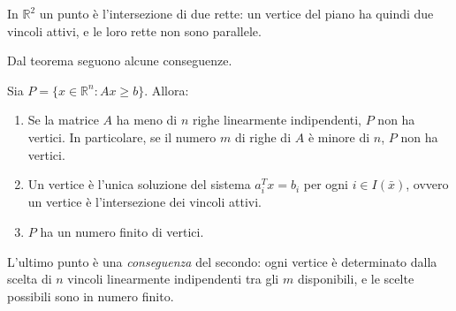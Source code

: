 \begin{osservazione}
In $\mathbb{R}^2$ un punto è l'intersezione di due rette: un vertice del piano ha quindi due vincoli attivi, e le loro rette non sono parallele.
\end{osservazione}

Dal teorema seguono alcune conseguenze.

\begin{corollario}\label{cor:vertici}
Sia $P = \{x \in \mathbb{R}^n : A x \ge b\}$. Allora:
\begin{enumerate}
    \item Se la matrice $A$ ha meno di $n$ righe linearmente indipendenti, $P$ non ha vertici. In particolare, se il numero $m$ di righe di $A$ è minore di $n$, $P$ non ha vertici.
    \item Un vertice è l'unica soluzione del sistema $a_i^T x = b_i$ per ogni $i \in I(\bar{x})$, ovvero un vertice è l'intersezione dei vincoli attivi.
    \item $P$ ha un numero finito di vertici.
\end{enumerate}
\end{corollario}

L'ultimo punto è una \emph{conseguenza} del secondo: ogni vertice è determinato dalla scelta di $n$ vincoli linearmente indipendenti tra gli $m$ disponibili, e le scelte possibili sono in numero finito.

